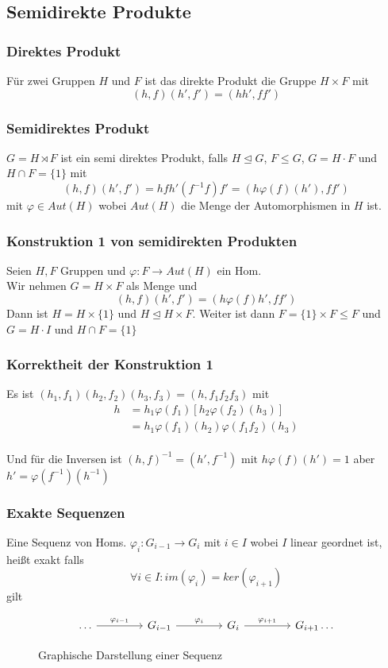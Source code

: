 \documentclass[12pt, german]{article}
\begin{document}
	\subsection{Semidirekte Produkte}
	\subsubsection{Direktes Produkt}
	Für zwei Gruppen $H$ und $F$ ist das direkte Produkt die Gruppe $H \times F$ mit  $$(h,f)(h', f') = (hh', ff')$$
	
	\subsubsection{Semidirektes Produkt}
	$G = H \rtimes F$ ist ein semi direktes Produkt, falls $H \trianglelefteq G$, $F \leq G$,  $G = H\cdot F$ und $H \cap F = \{1\}$ mit 
	$$(h,f)(h',f') = hfh'(f^{-1}f)f' = (h\varphi(f)(h'), ff')$$
	mit $\varphi \in Aut(H)$ wobei $Aut(H)$ die Menge der Automorphismen in $H$ ist.
	
	\subsubsection{Konstruktion 1 von semidirekten Produkten}
	Seien $H, F$ Gruppen und $\varphi: F\to Aut(H)$ ein Hom. \\ 
	Wir nehmen $G = H \times F$ als Menge und $$ (h,f)(h',f') = (h\varphi(f)h', ff')$$
	Dann ist $H= H \times \{1\}$ und $H \trianglelefteq H \times F$. 
	Weiter ist dann $F = \{1\} \times F \leq F$ und $G= H\cdot I$ und $H\cap F = \{1\}$
	
	\subsubsection{Korrektheit der Konstruktion 1}
	Es ist $(h_1, f_1)(h_2, f_2)(h_3, f_3) = (h, f_1f_2f_3)$ mit 
	\begin{align*}
		h&=h_1\varphi(f_1)[h_2\varphi(f_2)(h_3)] \\
		&=h_1\varphi(f_1)(h_2)\varphi(f_1f_2)(h_3)
	\end{align*} 
	\\ 
	Und für die Inversen ist $(h, f)^{-1} = (h', f^{-1}) \text{ mit } h\varphi(f)(h')= 1$ aber $h' = \varphi(f^{-1})(h^{-1})$
	
	\subsubsection{Exakte Sequenzen}
	Eine Sequenz von Homs. $\varphi_i: G_{i-1} \to G_i$ mit $i \in I$ wobei $I$ linear geordnet ist, heißt exakt falls $$\forall i \in I : im(\varphi_i) = ker(\varphi_{i+1})$$ gilt
	\begin{figure}[h!]
		\centering
		\begin{equation*}
			\begin{tikzcd}[column sep=3.5pc]
				\ldots \arrow{r}{\varphi_{i-1}} & G_{i -1} \arrow{r}{\varphi_{i}} & G_{i} \arrow{r}{\varphi_{i+1}} & G_{i+1} \ldots 
			\end{tikzcd}
		\end{equation*}
		\caption{Graphische Darstellung einer Sequenz}
	\end{figure}
	
\end{document}
